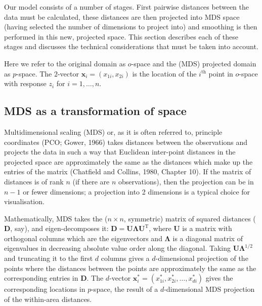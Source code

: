 \documentclass[useAMS, referee]{biom}
\begin{document}
Our model consists of a number of stages. First pairwise distances between the data must be calculated, these distances are then projected into MDS space (having selected the number of dimensions to project into) and smoothing is then performed in this new, projected space. This section describes each of these stages and discusses the technical considerations that must be taken into account. 

Here we refer to the original domain as $o$-space and the (MDS) projected domain as $p$-space. The $2$-vector $\mathbf{x}_i = (x_{1i}, x_{2i})$ is the location of the $i^\text{th}$ point in $o$-space with response $z_i$ for $i=1,\ldots,n$. 

\subsection{MDS as a transformation of space}

Multidimensional scaling (MDS) or, as it is often referred to, principle coordinates (PCO; Gower, 1966) takes distances between the observations and projects the data in such a way that Euclidean inter-point distances in the projected space are approximately the same as the distances which make up the entries of the matrix (Chatfield and Collins, 1980, Chapter 10). If the matrix of distances is of rank $n$ (if there are $n$ observations), then the projection can be in $n-1$ or fewer dimensions; a projection into 2 dimensions is a typical choice for visualisation.

Mathematically, MDS takes the ($n\times n$, symmetric) matrix of squared distances ($\mathbf{D}$, say), and eigen-decomposes it: $\mathbf{D}=\mathbf{U}\mathbf{\Lambda}\mathbf{U}^\text{T}$, where $\mathbf{U}$ is a matrix with orthogonal columns which are the eigenvectors and $\mathbf{\Lambda}$ is  a diagonal matrix of eigenvalues in decreasing absolute value order along the diagonal. Taking $\mathbf{U}\mathbf{\Lambda}^{1/2}$ and truncating it to the first $d$ columns gives a $d$-dimensional projection of the points where the distances between the points are approximately the same as the corresponding entries in $\mathbf{D}$. The $d$-vector $\mathbf{x}^*_i = (x^*_{1i}, x^*_{2i}, \ldots, x^*_{di})$ gives the corresponding locations in $p$-space, the result of a $d$-dimensional MDS projection of the within-area distances. 
\end{document}
